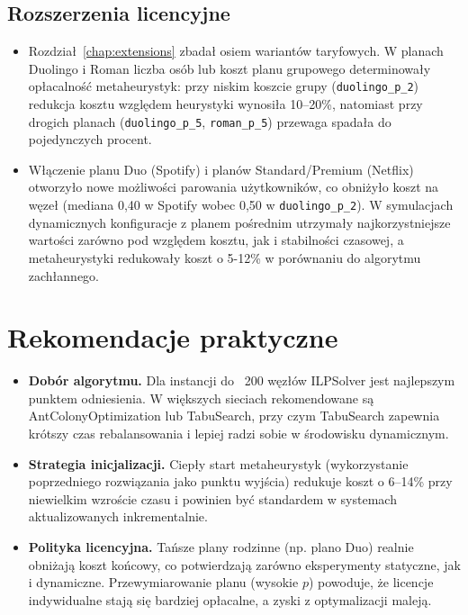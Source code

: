 \subsection*{Rozszerzenia licencyjne}
\begin{itemize}
  \item Rozdział~\ref{chap:extensions} zbadał osiem wariantów taryfowych. W planach Duolingo i Roman liczba osób lub koszt planu grupowego determinowały opłacalność metaheurystyk: przy niskim koszcie grupy (\texttt{duolingo\_p\_2}) redukcja kosztu względem heurystyki wynosiła 10--20\%, natomiast przy drogich planach (\texttt{duolingo\_p\_5}, \texttt{roman\_p\_5}) przewaga spadała do pojedynczych procent.
  \item Włączenie planu Duo (Spotify) i planów Standard/Premium (Netflix) otworzyło nowe możliwości parowania użytkowników, co obniżyło koszt na węzeł (mediana 0,40 w Spotify wobec 0,50 w \texttt{duolingo\_p\_2}). W symulacjach dynamicznych konfiguracje z planem pośrednim utrzymały najkorzystniejsze wartości zarówno pod względem kosztu, jak i stabilności czasowej, a metaheurystyki redukowały koszt o 5-12\% w porównaniu do algorytmu zachłannego.
\end{itemize}

\section{Rekomendacje praktyczne}

\begin{itemize}
  \item \textbf{Dobór algorytmu.} Dla instancji do ~200 węzłów ILPSolver jest najlepszym punktem odniesienia. W większych sieciach rekomendowane są AntColonyOptimization lub TabuSearch, przy czym TabuSearch zapewnia krótszy czas rebalansowania i lepiej radzi sobie w środowisku dynamicznym.
  \item \textbf{Strategia inicjalizacji.} Ciepły start metaheurystyk (wykorzystanie poprzedniego rozwiązania jako punktu wyjścia) redukuje koszt o 6--14\% przy niewielkim wzroście czasu i powinien być standardem w systemach aktualizowanych inkrementalnie.
  \item \textbf{Polityka licencyjna.} Tańsze plany rodzinne (np. plano Duo) realnie obniżają koszt końcowy, co potwierdzają zarówno eksperymenty statyczne, jak i dynamiczne. Przewymiarowanie planu (wysokie $p$) powoduje, że licencje indywidualne stają się bardziej opłacalne, a zyski z optymalizacji maleją.
\end{itemize}

